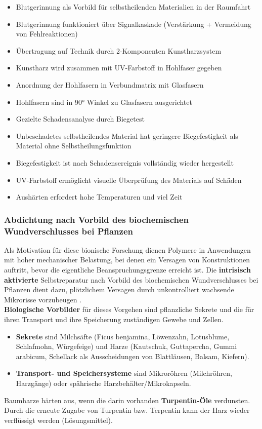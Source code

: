 \begin{itemize}
    \item Blutgerinnung als Vorbild für selbstheilenden Materialien in der Raumfahrt \dangersign
    \item Blutgerinnung funktioniert über Signalkaskade (Verstärkung + Vermeidung von Fehlreaktionen)
    \item Übertragung auf Technik durch 2-Komponenten Kunstharzsystem
    \item Kunstharz wird zusammen mit UV-Farbstoff in Hohlfaser gegeben
    \item Anordnung der Hohlfasern in Verbundmatrix mit Glasfasern
    \item Hohlfasern sind in 90° Winkel zu Glasfasern ausgerichtet
    \item Gezielte Schadensanalyse durch Biegetest
    \item Unbeschadetes selbstheilendes Material hat geringere Biegefestigkeit als Material ohne Selbstheilungsfunktion
    \item Biegefestigkeit ist nach Schadensereignis vollständig wieder hergestellt
    \item UV-Farbstoff ermöglicht visuelle Überprüfung des Materials auf Schäden
    \item Aushärten erfordert hohe Temperaturen und viel Zeit
\end{itemize}

\subsubsection{Abdichtung nach Vorbild des biochemischen Wundverschlusses bei Pflanzen}

Als Motivation für diese bionische Forschung dienen Polymere in Anwendungen mit hoher mechanischer Belastung, bei denen ein Versagen von Konstruktionen auftritt, bevor die eigentliche Beanspruchungsgrenze erreicht ist. Die \textbf{intrisisch aktivierte} Selbstreparatur nach Vorbild des biochemischen Wundverschlusses bei Pflanzen dient dazu, plötzlichem Versagen durch unkontrolliert wachsende Mikrorisse vorzubeugen \dangersign.\\

\textbf{Biologische Vorbilder} für dieses Vorgehen sind pflanzliche Sekrete und die für ihren Transport und ihre Speicherung zuständigen Gewebe und Zellen. 

\begin{itemize}
    \item \textbf{Sekrete} sind Milchsäfte (Ficus benjamina, Löwenzahn, Lotusblume, Schlafmohn, Würgefeige) und Harze (Kautschuk, Guttapercha, Gummi arabicum, Schellack als Ausscheidungen von Blattläusen, Balsam, Kiefern).
    \item \textbf{Transport- und Speichersysteme} sind Mikroröhren (Milchröhren, Harzgänge) oder spährische Harzbehälter/Mikrokapseln.
\end{itemize}
Baumharze härten aus, wenn die darin vorhanden \textbf{Turpentin-Öle} verdunsten. Durch die erneute Zugabe von Turpentin bzw. Terpentin kann der Harz wieder verflüssigt werden (Lösungsmittel).\\

